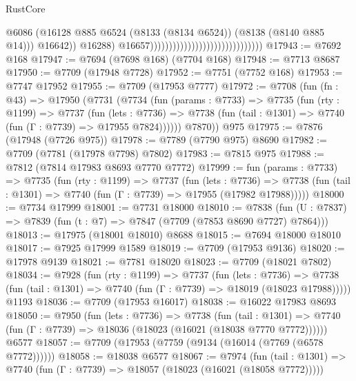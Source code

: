\begin{lexlean}{RustCore}
\begin{coremodule}
                                                                      @6086
                                                                      (@16128
                                                                        @885
                                                                        @6524
                                                                        (@8133 (@8134 @6524))
                                                                        (@8138 (@8140 @885 @14)))
                                                                      @16642))
                                                                  @16288)
                                                                @16657))))))))))))))))))))))))))))))
@17943 := @7692 @168
@17947 := @7694 (@7698 @168) (@7704 @168)
@17948 := @7713 @8687
@17950 := @7709 (@17948 @7728)
@17952 := @7751 (@7752 @168)
@17953 := @7747 @17952
@17955 := @7709 (@17953 @7777)
@17972 := @7708
    (fun (fn : @43) =>
    @17950
      (@7731
        (@7734
          (fun (params : @7733) =>
          @7735
            (fun (rty : @1199) =>
            @7737
              (fun (lets : @7736) =>
              @7738 (fun (tail : @1301) => @7740 (fun (Γ : @7739) => @17955 @7824))))))
        @7870))
    @975
@17975 := @7876 (@17948 (@7726 @975))
@17978 := @7789 (@7790 @975) @8690
@17982 := @7709 (@7781 (@17978 @7798) @7802)
@17983 := @7815 @975
@17988 := @7812 (@7814 @17983 @8693 @7770 @7772)
@17999 := fun (params : @7733) =>
  @7735
    (fun (rty : @1199) =>
    @7737
      (fun (lets : @7736) =>
      @7738 (fun (tail : @1301) => @7740 (fun (Γ : @7739) => @17955 (@17982 @17988)))))
@18000 := @7734 @17999
@18001 := @7731 @18000
@18010 := @7838 (fun (U : @7837) => @7839 (fun (t : @7) => @7847 (@7709 (@7853 @8690 @7727) @7864)))
@18013 := @17975 (@18001 @18010) @8688
@18015 := @7694 @18000 @18010
@18017 := @7925 @17999 @1589
@18019 := @7709 (@17953 @9136)
@18020 := @17978 @9139
@18021 := @7781 @18020
@18023 := @7709 (@18021 @7802)
@18034 := @7928
    (fun (rty : @1199) =>
    @7737
      (fun (lets : @7736) =>
      @7738 (fun (tail : @1301) => @7740 (fun (Γ : @7739) => @18019 (@18023 @17988)))))
    @1193
@18036 := @7709 (@17953 @16017)
@18038 := @16022 @17983 @8693
@18050 := @7950
    (fun (lets : @7736) =>
    @7738
      (fun (tail : @1301) =>
      @7740 (fun (Γ : @7739) => @18036 (@18023 (@16021 (@18038 @7770 @7772))))))
    @6577
@18057 := @7709 (@17953 (@7759 (@9134 (@16014 (@7769 (@6578 @7772))))))
@18058 := @18038 @6577
@18067 := @7974
    (fun (tail : @1301) => @7740 (fun (Γ : @7739) => @18057 (@18023 (@16021 (@18058 @7772)))))

\end{coremodule}
\end{lexlean}
